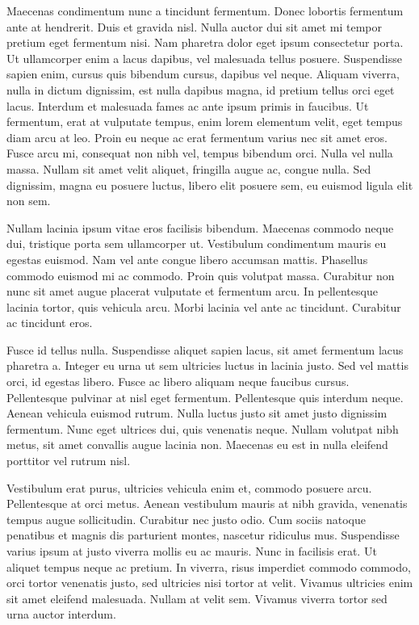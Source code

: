 Maecenas condimentum nunc a tincidunt fermentum. Donec lobortis fermentum ante at hendrerit. Duis et gravida nisl. Nulla auctor dui sit amet mi tempor pretium eget fermentum nisi. Nam pharetra dolor eget ipsum consectetur porta. Ut ullamcorper enim a lacus dapibus, vel malesuada tellus posuere. Suspendisse sapien enim, cursus quis bibendum cursus, dapibus vel neque. Aliquam viverra, nulla in dictum dignissim, est nulla dapibus magna, id pretium tellus orci eget lacus. Interdum et malesuada fames ac ante ipsum primis in faucibus. Ut fermentum, erat at vulputate tempus, enim lorem elementum velit, eget tempus diam arcu at leo. Proin eu neque ac erat fermentum varius nec sit amet eros. Fusce arcu mi, consequat non nibh vel, tempus bibendum orci. Nulla vel nulla massa. Nullam sit amet velit aliquet, fringilla augue ac, congue nulla. Sed dignissim, magna eu posuere luctus, libero elit posuere sem, eu euismod ligula elit non sem.

Nullam lacinia ipsum vitae eros facilisis bibendum. Maecenas commodo neque dui, tristique porta sem ullamcorper ut. Vestibulum condimentum mauris eu egestas euismod. Nam vel ante congue libero accumsan mattis. Phasellus commodo euismod mi ac commodo. Proin quis volutpat massa. Curabitur non nunc sit amet augue placerat vulputate et fermentum arcu. In pellentesque lacinia tortor, quis vehicula arcu. Morbi lacinia vel ante ac tincidunt. Curabitur ac tincidunt eros.

Fusce id tellus nulla. Suspendisse aliquet sapien lacus, sit amet fermentum lacus pharetra a. Integer eu urna ut sem ultricies luctus in lacinia justo. Sed vel mattis orci, id egestas libero. Fusce ac libero aliquam neque faucibus cursus. Pellentesque pulvinar at nisl eget fermentum. Pellentesque quis interdum neque. Aenean vehicula euismod rutrum. Nulla luctus justo sit amet justo dignissim fermentum. Nunc eget ultrices dui, quis venenatis neque. Nullam volutpat nibh metus, sit amet convallis augue lacinia non. Maecenas eu est in nulla eleifend porttitor vel rutrum nisl.

Vestibulum erat purus, ultricies vehicula enim et, commodo posuere arcu. Pellentesque at orci metus. Aenean vestibulum mauris at nibh gravida, venenatis tempus augue sollicitudin. Curabitur nec justo odio. Cum sociis natoque penatibus et magnis dis parturient montes, nascetur ridiculus mus. Suspendisse varius ipsum at justo viverra mollis eu ac mauris. Nunc in facilisis erat. Ut aliquet tempus neque ac pretium. In viverra, risus imperdiet commodo commodo, orci tortor venenatis justo, sed ultricies nisi tortor at velit. Vivamus ultricies enim sit amet eleifend malesuada. Nullam at velit sem. Vivamus viverra tortor sed urna auctor interdum.

